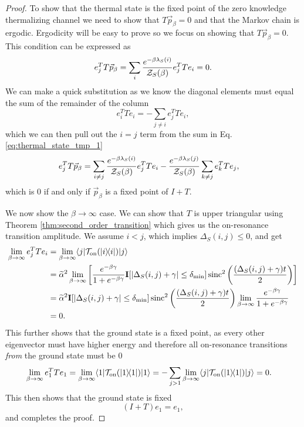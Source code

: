 \begin{proof}
    To show that the thermal state is the fixed point of the zero knowledge thermalizing channel we need to show that 
$T \vec{p}_{\beta} = 0$ and that the Markov chain is ergodic. Ergodicity will be easy to prove so we focus on showing that $T \vec{p}_{\beta} = 0$. This condition can be expressed as
\begin{equation}
    e_j^T T \vec{p}_{\beta} = \sum_i \frac{e^{-\beta \lambda_S(i)}}{\mathcal{Z}_S(\beta)} e_j^T T e_i = 0.   \label{eq:thermal_state_tmp_1}
\end{equation}
We can make a quick substitution as we know the diagonal elements must equal the sum of the remainder of the column 
\begin{equation}
    e_i^T T e_i = - \sum_{j \neq i} e_j^T T e_i,
\end{equation}
which we can then pull out the $i = j$ term from the sum in Eq. \eqref{eq:thermal_state_tmp_1}
\begin{align}
    e_j^T T \vec{p}_{\beta} &= \sum_{i \neq j} \frac{e^{-\beta \lambda_S(i)}}{\mathcal{Z}_S(\beta)} e_j^T T e_i - \frac{e^{-\beta \lambda_S(j)}}{\mathcal{Z}_S(\beta)} \sum_{k \neq j} e_k^T T e_j,
\end{align}
which is 0 if and only if $\vec{p}_{\beta}$ is a fixed point of $I + T$.

We now show the $\beta \to \infty$ case. We can show that $T$ is upper triangular using Theorem \ref{thm:second_order_transition} which gives us the on-resonance transition amplitude. We assume $i < j$, which implies $\Delta_S(i,j) \le 0$, and get
    \begin{align}
        \lim_{\beta \to \infty} e_j^T T e_i &= \lim_{\beta \to \infty} \langle j| \mathcal{T}_{\rm on}(| i\rangle\! \langle i|) |j\rangle \\
        &= \widetilde{\alpha}^2 \lim_{\beta \to \infty} \left[ \frac{e^{-\beta \gamma}}{1 + e^{-\beta \gamma}} \mathbf{I}[|\Delta_S(i,j) + \gamma| \le \delta_{\min}] \operatorname{sinc}^2 \left(\frac{(\Delta_S(i, j) + \gamma) t}{2} \right) \right] \\
        &= \widetilde{\alpha}^2 \mathbf{I}[|\Delta_S(i,j) + \gamma| \le \delta_{\min}] \operatorname{sinc}^2 \left(\frac{(\Delta_S(i, j) + \gamma) t}{2} \right) \lim_{\beta \to \infty} \frac{e^{-\beta \gamma}}{1 + e^{-\beta \gamma}} \\
        &= 0.
    \end{align}
    This further shows that the ground state is a fixed point, as every other eigenvector must have higher energy and therefore all on-resonance transitions \emph{from} the ground state must be 0
    \begin{align}
        \lim_{\beta \to \infty} e_1^T T e_1 &= \lim_{\beta \to \infty} \langle 1| \mathcal{T}_{\rm on}(| 1\rangle\! \langle 1|) |1\rangle = -  \sum_{j > 1} \lim_{\beta \to \infty} \langle j| \mathcal{T}_{\rm on}(| 1\rangle\! \langle 1|) |j\rangle  = 0.
    \end{align}
    This then shows that the ground state is fixed
    \begin{equation}
        (I + T) e_1 = e_1,
    \end{equation}
    and completes the proof.
\end{proof}

